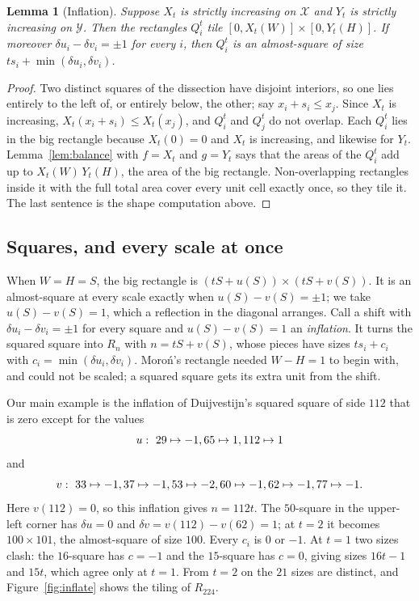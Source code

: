 \documentclass[11pt]{amsart}
\newtheorem{lem}[thm]{Lemma}
\theoremstyle{definition}
\newcommand{\R}{R}
\begin{document}
\begin{lem}[Inflation]\label{lem:inflation}
Suppose $X_t$ is strictly increasing on $\mathcal X$ and $Y_t$ is strictly increasing on
$\mathcal Y$. Then the rectangles $Q_i^t$ tile $[0,X_t(W)]\times[0,Y_t(H)]$. If moreover
$\delta u_i-\delta v_i=\pm1$ for every $i$, then $Q_i^t$ is an almost-square of size
$ts_i+\min(\delta u_i,\delta v_i)$.
\end{lem}

\begin{proof}
Two distinct squares of the dissection have disjoint interiors, so one lies entirely to the left of,
or entirely below, the other; say $x_i+s_i\le x_j$. Since $X_t$ is increasing,
$X_t(x_i+s_i)\le X_t(x_j)$, and $Q_i^t$ and $Q_j^t$ do not overlap. Each $Q_i^t$ lies in the big
rectangle because $X_t(0)=0$ and $X_t$ is increasing, and likewise for $Y_t$. Lemma~\ref{lem:balance}
with $f=X_t$ and $g=Y_t$ says that the areas of the $Q_i^t$ add up to $X_t(W)\,Y_t(H)$, the area of
the big rectangle. Non-overlapping rectangles inside it with the full total area cover every unit cell
exactly once, so they tile it. The last sentence is the shape computation above.
\end{proof}

\subsection*{Squares, and every scale at once} When $W=H=S$, the big rectangle is
$(tS+u(S))\times(tS+v(S))$. It is an almost-square at every scale exactly when $u(S)-v(S)=\pm1$; we
take $u(S)-v(S)=1$, which a reflection in the diagonal arranges. Call a shift with
$\delta u_i-\delta v_i=\pm1$ for every square and $u(S)-v(S)=1$ an \emph{inflation}. It turns the
squared square into $\R_n$ with $n=tS+v(S)$, whose pieces have sizes $ts_i+c_i$ with
$c_i=\min(\delta u_i,\delta v_i)$. Moro\'n's rectangle needed $W-H=1$ to begin with, and could
not be scaled; a squared square gets its extra unit from the shift.

Our main example is the inflation of Duijvestijn's squared square of side $112$ that is zero except
for the values
\[
u:\ \inflU
\]
and
\[
v:\ 33\mapsto -1, 37\mapsto -1, 53\mapsto -2, 60\mapsto -1, 62\mapsto -1, 77\mapsto -1.
\]
Here $v(112)=0$, so this inflation gives $n=112t$. The $50$-square in the upper-left corner has
$\delta u=0$ and $\delta v=v(112)-v(62)=1$; at $t=2$ it becomes $100\times101$, the almost-square of
size $100$. Every $c_i$ is $0$ or $-1$. At $t=1$ two sizes clash: the $16$-square has $c=-1$ and
the $15$-square has $c=0$, giving sizes $16t-1$ and $15t$, which agree only at $t=1$. From $t=2$ on
the $21$ sizes are distinct, and Figure~\ref{fig:inflate} shows the tiling of $\R_{224}$.
\end{document}
